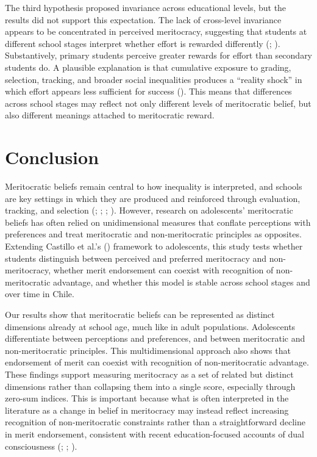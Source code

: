 \documentclass[
  13pt,
]{article}
\begin{document}
The third hypothesis proposed invariance across educational levels, but
the results did not support this expectation. The lack of cross-level
invariance appears to be concentrated in perceived meritocracy,
suggesting that students at different school stages interpret whether
effort is rewarded differently
(;
).
Substantively, primary students perceive greater rewards for effort than
secondary students do. A plausible explanation is that cumulative
exposure to grading, selection, tracking, and broader social
inequalities produces a ``reality shock'' in which effort appears less
sufficient for success (). This means that differences across school stages may
reflect not only different levels of meritocratic belief, but also
different meanings attached to meritocratic reward.

\section{Conclusion}\label{conclusion}

Meritocratic beliefs remain central to how inequality is interpreted,
and schools are key settings in which they are produced and reinforced
through evaluation, tracking, and selection
(;
;
;
). However,
research on adolescents' meritocratic beliefs has often relied on
unidimensional measures that conflate perceptions with preferences and
treat meritocratic and non-meritocratic principles as opposites.
Extending Castillo et al.'s
() framework to
adolescents, this study tests whether students distinguish between
perceived and preferred meritocracy and non-meritocracy, whether merit
endorsement can coexist with recognition of non-meritocratic advantage,
and whether this model is stable across school stages and over time in
Chile.

Our results show that meritocratic beliefs can be represented as
distinct dimensions already at school age, much like in adult
populations. Adolescents differentiate between perceptions and
preferences, and between meritocratic and non-meritocratic principles.
This multidimensional approach also shows that endorsement of merit can
coexist with recognition of non-meritocratic advantage. These findings
support measuring meritocracy as a set of related but distinct
dimensions rather than collapsing them into a single score, especially
through zero-sum indices. This is important because what is often
interpreted in the literature as a change in belief in meritocracy may
instead reflect increasing recognition of non-meritocratic constraints
rather than a straightforward decline in merit endorsement, consistent
with recent education-focused accounts of dual consciousness
(;
;
).
\end{document}
